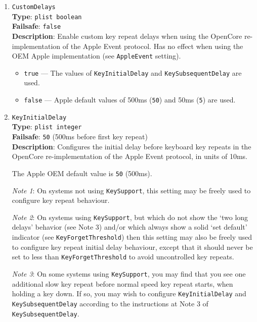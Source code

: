 \documentclass[]{article}
\providecommand{\tightlist}{%
  \setlength{\itemsep}{0pt}\setlength{\parskip}{0pt}}
\begin{document}
\begin{enumerate}
\item
  \texttt{CustomDelays}\\
  \textbf{Type}: \texttt{plist\ boolean}\\
  \textbf{Failsafe}: \texttt{false}\\
  \textbf{Description}: Enable custom key repeat delays when using the OpenCore re-implementation
  of the Apple Event protocol.
  Has no effect when using the OEM Apple implementation (see \texttt{AppleEvent} setting).

  \begin{itemize}
  \tightlist
  \item \texttt{true} --- The values of \texttt{KeyInitialDelay} and \texttt{KeySubsequentDelay} are used.
  \item \texttt{false} --- Apple default values of 500ms (\texttt{50}) and 50ms (\texttt{5}) are used.
  \end{itemize}

\item
  \texttt{KeyInitialDelay}\\
  \textbf{Type}: \texttt{plist\ integer}\\
  \textbf{Failsafe}: \texttt{50} (500ms before first key repeat)\\
  \textbf{Description}: Configures the initial delay before keyboard key repeats in the
  OpenCore re-implementation of the Apple Event protocol, in units of 10ms.

  The Apple OEM default value is \texttt{50} (500ms).

  \emph{Note 1}: On systems not using \texttt{KeySupport}, this setting may be freely used
  to configure key repeat behaviour.

  \emph{Note 2}: On systems using \texttt{KeySupport}, but which do not show the `two long
  delays' behavior (see Note 3) and/or which always show a solid `set default' indicator (see \texttt{KeyForgetThreshold})
  then this setting may also be freely used to configure key repeat initial delay behaviour,
  except that it should never be set to less than \texttt{KeyForgetThreshold} to avoid
  uncontrolled key repeats.

  \emph{Note 3}: On some systems using \texttt{KeySupport}, you may find that you see
  one additional slow key repeat before normal speed key repeat starts, when holding a
  key down. If so, you may wish to configure \texttt{KeyInitialDelay} and \texttt{KeySubsequentDelay}
  according to the instructions at Note 3 of \texttt{KeySubsequentDelay}.



\end{enumerate}
\end{document}

